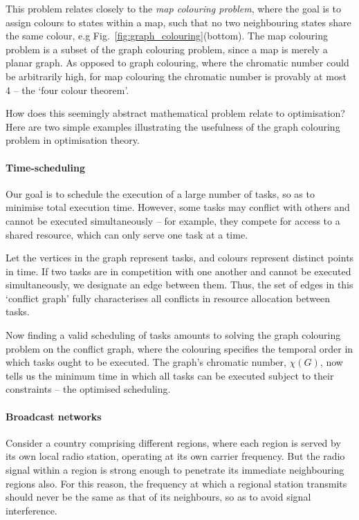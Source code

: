 This problem relates closely to the \textit{map colouring problem}, where the goal is to assign colours to states within a map, such that no two neighbouring states share the same colour, e.g Fig.~\ref{fig:graph_colouring}(bottom). The map colouring problem is a subset of the graph colouring problem, since a map is merely a planar graph. As opposed to graph colouring, where the chromatic number could be arbitrarily high, for map colouring the chromatic number is provably at most 4 -- the `four colour theorem'.

How does this seemingly abstract mathematical problem relate to optimisation? Here are two simple examples illustrating the usefulness of the graph colouring problem in optimisation theory.

\paragraph{Time-scheduling}

Our goal is to schedule the execution of a large number of tasks, so as to minimise total execution time. However, some tasks may conflict with others and cannot be executed simultaneously -- for example, they compete for access to a shared resource, which can only serve one task at a time.

Let the vertices in the graph represent tasks, and colours represent distinct points in time. If two tasks are in competition with one another and cannot be executed simultaneously, we designate an edge between them. Thus, the set of edges in this `conflict graph' fully characterises all conflicts in resource allocation between tasks.

Now finding a valid scheduling of tasks amounts to solving the graph colouring problem on the conflict graph, where the colouring specifies the temporal order in which tasks ought to be executed. The graph's chromatic number, $\chi(G)$, now tells us the minimum time in which all tasks can be executed subject to their constraints -- the optimised scheduling.

\paragraph{Broadcast networks}

Consider a country comprising different regions, where each region is served by its own local radio station, operating at its own carrier frequency. But the radio signal within a region is strong enough to penetrate its immediate neighbouring regions also. For this reason, the frequency at which a regional station transmits should never be the same as that of its neighbours, so as to avoid signal interference.

